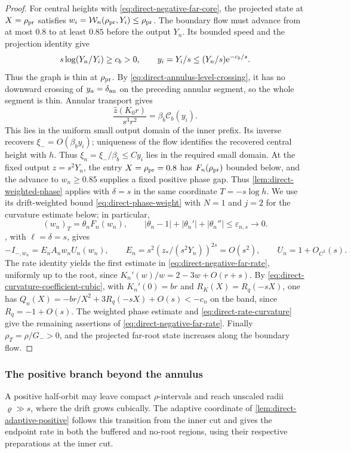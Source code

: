 \begin{proof}
For central heights with \eqref{eq:direct-negative-far-core}, the projected
state at \(X=\rho_{\rm pr}\) satisfies
\(w_i=\mathcal W_n(\rho_{\rm pr},Y_i)\le\rho_{\rm pr}\). The boundary
flow must advance from at most \(0.8\) to at least
\(0.85\) before the output \(Y_n\). Its bounded
speed and the projection identity give
\[
 s\log(Y_n/Y_i)\ge c_b>0,\qquad
 y_i=Y_i/s\le(Y_n/s)\mathrm e^{-c_b/s}.
\]
Thus the graph is thin at \(\rho_{\rm pr}\).
By \eqref{eq:direct-annulus-level-crossing}, it has no downward crossing
of \(y_a=\delta_{\rm an}\) on the preceding annular segment, so the whole
segment is thin. Annular transport gives
\[
 \frac{\widehat z(K_0r)}{s^3r^2}
       =\beta_b\mathcal C_b(y_i).
\]
This lies in the uniform small output domain of the
inner prefix. Its inverse recovers
\(\xi_-=O(\beta_by_i)\); uniqueness of the
flow identifies the recovered central height with \(h\). Thus
\(\xi_n=\xi_-/\beta_b\le Cy_i\) lies in the required small
domain. At the fixed output \(z=s^2Y_n\), the entry
\(X=\rho_{\rm pr}=0.8\) has \(F_n(\rho_{\rm pr})\) bounded below,
and the advance to \(w_n\ge0.85\) supplies a fixed positive phase
gap. Thus \cref{lem:direct-weighted-phase} applies with \(\delta=s\)
in the same coordinate \(T=-s\log h\). We use its drift-weighted
bound \eqref{eq:direct-phase-weight} with \(N=1\) and \(j=2\)
for the curvature estimate below; in particular,
\[
 (w_n)_T=\theta_nF_n(w_n),\qquad
 |\theta_n-1|+|\theta_n'|+|\theta_n''|
                         \le\varepsilon_{n,s}\longrightarrow0 .
\]
, with \(\ell=\delta=s\), gives
\[
 -I_{-,w_n}=E_nA_nw_nU_n(w_n),\qquad
 E_n=s^2(z_*/(s^2Y_n))^{2s}=O(s^2),\qquad
 U_n=1+O_{C^3}(s).
\]
The rate identity yields the first estimate in
\eqref{eq:direct-negative-far-rate}, uniformly up to the root, since
\(K_n'(w)/w=2-3w+O(r+s)\). By
\eqref{eq:direct-curvature-coefficient-cubic}, with \(K_n'(0)=br\) and
\(R_K(X)=R_q(-sX)\), one has
\(Q_n(X)=-br/X^2+3R_q(-sX)+O(s)<-c_n\) on the band, since
\(R_q=-1+O(s)\). The weighted phase estimate and
\eqref{eq:direct-rate-curvature} give the remaining assertions of
\eqref{eq:direct-negative-far-rate}. Finally \(\rho_T=\rho/G_->0\), and
the projected far-root state increases along the boundary flow.
\end{proof}

\subsubsection{The positive branch beyond the annulus}

A positive half-orbit may leave compact \(\rho\)-intervals and reach
unscaled radii \(\varrho\gg s\), where the drift grows cubically.
The adaptive coordinate of \cref{lem:direct-adaptive-positive} follows
this transition from the inner cut and gives the endpoint rate in both
the buffered and no-root regions, using their respective preparations
at the inner cut.

